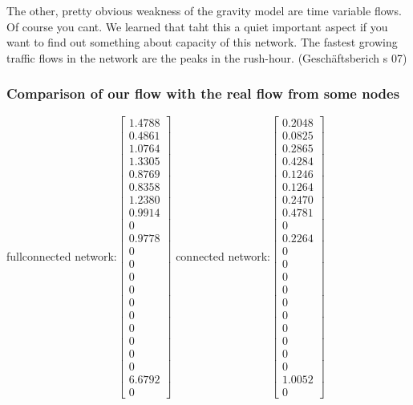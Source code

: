 \documentclass[11pt]{article}
\begin{document}
The other, pretty obvious weakness of the gravity model are time variable flows. Of course you cant. We learned that taht this a quiet important aspect  if you want to find out something about capacity of this network. The fastest growing traffic flows in the network are the peaks in the rush-hour. (Geschäftsberich s 07)

\subsubsection{Comparison of our flow with the real flow from some nodes}
fullconnected network:$\begin{bmatrix}
    1.4788\\
    0.4861\\
    1.0764\\
    1.3305\\
    0.8769\\
    0.8358\\
    1.2380\\
    0.9914\\
         0\\
    0.9778\\
         0\\
         0\\
         0\\
         0\\
         0\\
         0\\
         0\\
         0\\
         0\\
         0\\
    6.6792\\
         0
\end{bmatrix}$
connected network:$\begin{bmatrix}
    0.2048\\
    0.0825\\
    0.2865\\
    0.4284\\
    0.1246\\
    0.1264\\
    0.2470\\
    0.4781\\
         0\\
    0.2264\\
         0\\
         0\\
         0\\
         0\\
         0\\
         0\\
         0\\
         0\\
         0\\
         0\\
    1.0052\\
         0

\end{bmatrix}$
\end{document}
